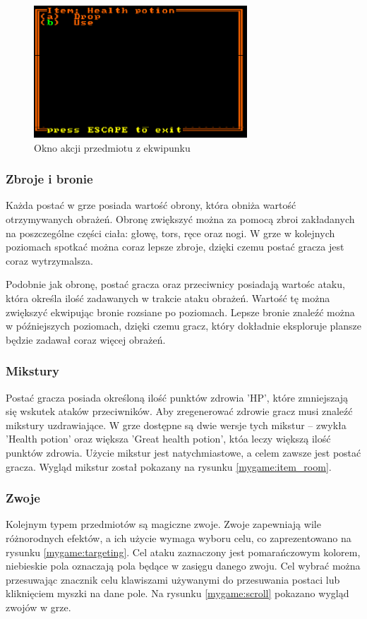 \documentclass[12pt,twoside]{article}
\begin{document}
\FloatBarrier
\begin{figure}[h]
	\centering
	\includegraphics[width=8cm]{images/mygame/item_menu.png}
	\caption{Okno akcji przedmiotu z ekwipunku}
	\label{mygame:item_menu}
\end{figure}
\FloatBarrier


\subsubsection{Zbroje i bronie}
Każda postać w grze posiada wartość obrony, która obniża wartość otrzymywanych obrażeń. Obronę zwiększyć można za pomocą zbroi zakładanych na poszczególne części ciała: głowę, tors, ręce oraz nogi. W grze w kolejnych poziomach spotkać można coraz lepsze zbroje, dzięki czemu postać gracza jest coraz wytrzymalsza.

Podobnie jak obronę, postać gracza oraz przeciwnicy posiadają wartośc ataku, która określa ilość zadawanych w trakcie ataku obrażeń. Wartość tę można zwiększyć ekwipując bronie rozsiane po poziomach. Lepsze bronie znaleźć można w późniejszych poziomach, dzięki czemu gracz, który dokładnie eksploruje plansze będzie zadawał coraz więcej obrażeń.


\subsubsection{Mikstury}
Postać gracza posiada określoną ilość punktów zdrowia 'HP', które zmniejszają się wskutek ataków przeciwników. Aby zregenerować zdrowie gracz musi znaleźć mikstury uzdrawiające. W grze dostępne są dwie wersje tych mikstur -- zwykła 'Health potion' oraz większa 'Great health potion', któa leczy większą ilość punktów zdrowia. Użycie mikstur jest natychmiastowe, a celem zawsze jest postać gracza. Wygląd mikstur został pokazany na rysunku \ref{mygame:item_room}.


\subsubsection{Zwoje}
Kolejnym typem przedmiotów są magiczne zwoje. Zwoje zapewniają wile różnorodnych efektów, a ich użycie wymaga wyboru celu, co zaprezentowano na rysunku \ref{mygame:targeting}. Cel ataku zaznaczony jest pomarańczowym kolorem, niebieskie pola oznaczają pola będące w zasięgu danego zwoju. Cel wybrać można przesuwając znacznik celu klawiszami używanymi do przesuwania postaci lub kliknięciem myszki na dane pole. Na rysunku \ref{mygame:scroll} pokazano wygląd zwojów w grze.
\end{document}
